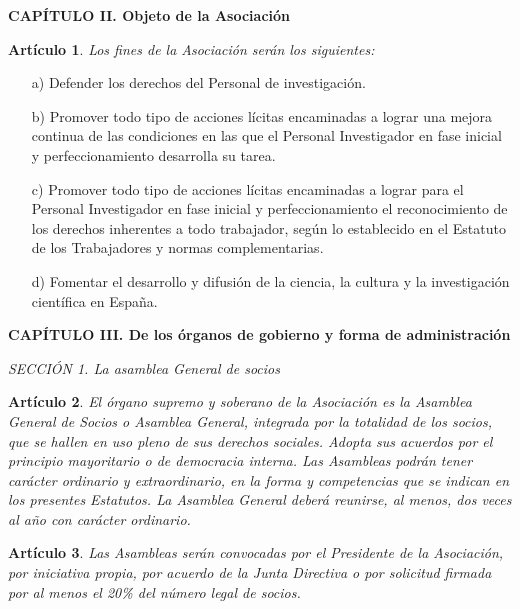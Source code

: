 \documentclass[a4paper,12pt]{article}
\theoremstyle{mystyle}		%
\newtheorem{art}{Artículo}	%
\begin{document}
\begin{onehalfspace}
\bigskip

\begin{center}
\textbf{CAPÍTULO II. Objeto de la Asociación}
\end{center}

\begin{art}
Los fines de la Asociación serán los siguientes:
\end{art}
\begin{itemize}
\item [a)] Defender los derechos del Personal de investigación.
\item [b)] Promover todo tipo de acciones lícitas encaminadas a lograr una mejora continua de las condiciones en las que el Personal Investigador en fase inicial y perfeccionamiento desarrolla su tarea.
\item [c)] Promover todo tipo de acciones lícitas encaminadas a lograr para el Personal Investigador en fase inicial y perfeccionamiento el reconocimiento de los derechos inherentes a todo trabajador, según lo establecido en el Estatuto de  los Trabajadores y normas complementarias.
\item [d)] Fomentar el desarrollo y difusión de la ciencia, la cultura y la investigación científica en España.
\end{itemize}

\bigskip
\begin{center}
\textbf{CAPÍTULO III. De los órganos de gobierno y forma de administración}
\end{center}

\bigskip

\textit{SECCIÓN 1\textordfeminine. La asamblea General de socios}

\begin{art}
El órgano supremo y soberano de la Asociación es la Asamblea General de Socios o Asamblea General, integrada por la totalidad de los socios, que se hallen en uso pleno de sus derechos sociales. Adopta sus acuerdos por el principio mayoritario o de democracia interna. Las Asambleas podrán tener carácter ordinario y extraordinario, en la forma y competencias que se indican en los presentes Estatutos. La Asamblea General deberá reunirse, al menos, dos veces al año con carácter ordinario.
\end{art}

\begin{art}
Las Asambleas serán convocadas por el Presidente de la Asociación, por iniciativa propia, por acuerdo de la Junta Directiva o por solicitud firmada por al menos el 20\% del número legal de socios.
\end{art}


\end{onehalfspace}
\end{document}
